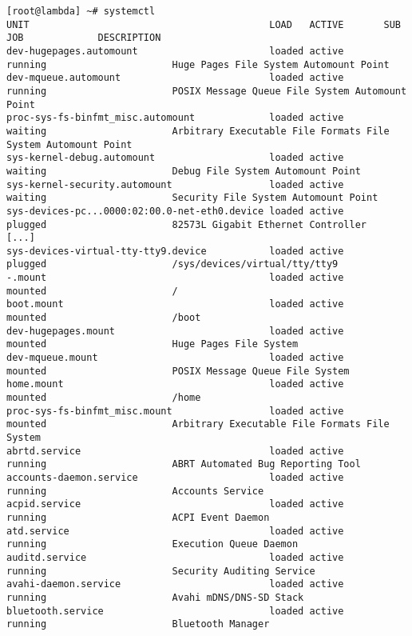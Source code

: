 \documentclass[titlepage]{article}
\begin{document}
\begin{lstlisting}
[root@lambda] ~# systemctl
UNIT                                          LOAD   ACTIVE       SUB          JOB             DESCRIPTION
dev-hugepages.automount                       loaded active       running                      Huge Pages File System Automount Point
dev-mqueue.automount                          loaded active       running                      POSIX Message Queue File System Automount Point
proc-sys-fs-binfmt_misc.automount             loaded active       waiting                      Arbitrary Executable File Formats File System Automount Point
sys-kernel-debug.automount                    loaded active       waiting                      Debug File System Automount Point
sys-kernel-security.automount                 loaded active       waiting                      Security File System Automount Point
sys-devices-pc...0000:02:00.0-net-eth0.device loaded active       plugged                      82573L Gigabit Ethernet Controller
[...]
sys-devices-virtual-tty-tty9.device           loaded active       plugged                      /sys/devices/virtual/tty/tty9
-.mount                                       loaded active       mounted                      /
boot.mount                                    loaded active       mounted                      /boot
dev-hugepages.mount                           loaded active       mounted                      Huge Pages File System
dev-mqueue.mount                              loaded active       mounted                      POSIX Message Queue File System
home.mount                                    loaded active       mounted                      /home
proc-sys-fs-binfmt_misc.mount                 loaded active       mounted                      Arbitrary Executable File Formats File System
abrtd.service                                 loaded active       running                      ABRT Automated Bug Reporting Tool
accounts-daemon.service                       loaded active       running                      Accounts Service
acpid.service                                 loaded active       running                      ACPI Event Daemon
atd.service                                   loaded active       running                      Execution Queue Daemon
auditd.service                                loaded active       running                      Security Auditing Service
avahi-daemon.service                          loaded active       running                      Avahi mDNS/DNS-SD Stack
bluetooth.service                             loaded active       running                      Bluetooth Manager

\end{lstlisting}
\end{document}
